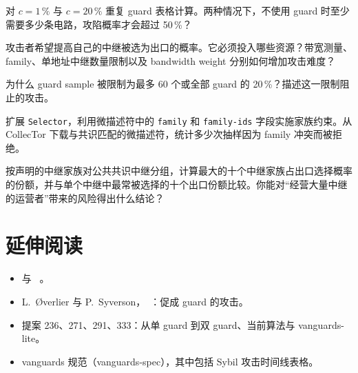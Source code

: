 \begin{esercizio}[2]\label{es:13-guard}
对 $c=1\,\%$ 与 $c=20\,\%$ 重复 guard 表格计算。两种情况下，不使用 guard 时至少需要多少条电路，攻陷概率才会超过 50\,\%？
\end{esercizio}

\begin{esercizio}[2]\label{es:13-sybil}
攻击者希望提高自己的中继被选为出口的概率。它必须投入哪些资源？带宽测量、family、单地址中继数量限制以及 bandwidth weight 分别如何增加攻击难度？
\end{esercizio}

\begin{esercizio}[2]\label{es:13-campione}
为什么 guard sample 被限制为最多 60 个或全部 guard 的 20\,\%？描述这一限制阻止的攻击。
\end{esercizio}

\begin{esercizio}[3]\label{es:13-famiglie}
扩展 \texttt{Selector}，利用微描述符中的 \texttt{family} 和 \texttt{family-ids} 字段实施家族约束。从 CollecTor 下载与共识匹配的微描述符，统计多少次抽样因为 family 冲突而被拒绝。
\end{esercizio}

\begin{esercizio}[3]\label{es:13-operatori}
按声明的中继家族对公共共识中继分组，计算最大的十个中继家族占出口选择概率的份额，并与单个中继中最常被选择的十个出口份额比较。你能对“经营大量中继的运营者”带来的风险得出什么结论？
\end{esercizio}

\section*{延伸阅读}
\begin{itemize}
  \item {} 与 ~\cite{torspec}。
  \item L.~Øverlier 与 P.~Syverson，~\cite{overlier2006locating}：促成 guard 的攻击。
  \item 提案 236、271、291、333：从单 guard 到双 guard、当前算法与 vanguards-lite。
  \item vanguards 规范（vanguards-spec），其中包括 Sybil 攻击时间线表格。
\end{itemize}
